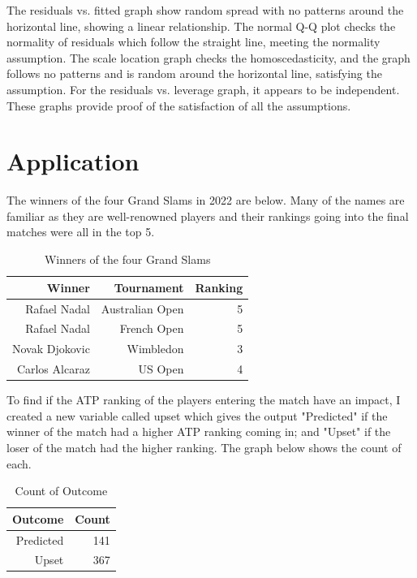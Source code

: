 \documentclass[12pt]{article}
\begin{document}
The residuals vs. fitted graph show random spread with no patterns around the horizontal line, 
showing a linear relationship. The normal Q-Q plot checks the normality of residuals which follow the 
straight line, meeting the normality assumption. The scale location graph checks the homoscedasticity, 
and the graph follows no patterns and is random around the horizontal line, satisfying the assumption. 
For the residuals vs. leverage graph, it appears to be independent. These graphs provide proof of the 
satisfaction of all the assumptions. 


\section{Application}
\label{sec:application}

The winners of the four Grand Slams in 2022 are below. Many of the names are familiar 
as they are well-renowned players and their rankings going into the final matches were 
all in the top 5.

\begin{table}[ht]
  \caption{Winners of the four Grand Slams}
  \label{tab:winner}
\centering
\begin{tabular}{rrr}
  \hline
Winner & Tournament & Ranking\\
  \hline
Rafael Nadal & Australian Open & 5\\
Rafael Nadal & French Open & 5\\
Novak Djokovic & Wimbledon & 3\\
Carlos Alcaraz & US Open & 4\\
  \hline
\end{tabular}
\end{table}


To find if the ATP ranking of the players entering the match have an impact, I created a new 
variable called upset which gives the output "Predicted" if the winner of the match had a higher 
ATP ranking coming in; and "Upset" if the loser of the match had the higher ranking. The graph 
below shows the count of each.

\begin{table}[! h]
  \caption{Count of Outcome}
  \label{tab:upset}
\centering
\begin{tabular}{rr}
  \hline
Outcome & Count \\
  \hline
Predicted & 141 \\
Upset & 367 \\
  \hline
\end{tabular}
\end{table}
\end{document}
